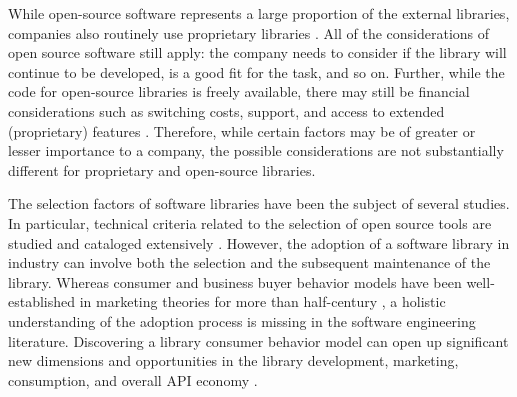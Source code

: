 \documentclass[manuscript,review,screen, table]{acmart}
\begin{document}
While open-source software represents a large proportion of the external libraries, companies also routinely use proprietary libraries \cite{harutyunyan:2018:understanding}. All of the considerations of open source software still apply: the company needs to consider if the library will continue to be developed, is a good fit for the task, and so on. Further, while the code for open-source libraries is freely available, there may still be financial considerations such as switching costs, support, and access to extended (proprietary) features \cite{dahlander2006business}. Therefore, while certain factors may be of greater or lesser importance to a company, the possible considerations are not substantially different for proprietary and open-source libraries. 


The selection factors of software libraries have been the subject of several studies. In particular, technical criteria related to the selection of open source tools are studied and cataloged extensively \cite{wasserman2017osspal, li2022exploring, larios2020selecting, huang2018tell, wang2020difftech, wang2021difftech, uddin2017automatic, uddin2017opiner, de2018library, de2018empirical, el2020libcomp, yan2022concept, liu2021api, uddin2019understanding, larios2020selecting}. However, the adoption of a software library in industry can involve both the selection and the subsequent maintenance of the library. 
Whereas consumer and business buyer behavior models have been well-established in marketing theories for more than half-century \cite{kotler1965behavioral}, a holistic understanding of the adoption process is missing in the software engineering literature. Discovering a library consumer behavior model can open up significant new dimensions and opportunities in the library development, marketing, consumption, and overall API economy \cite{tan2016service}.
\end{document}
